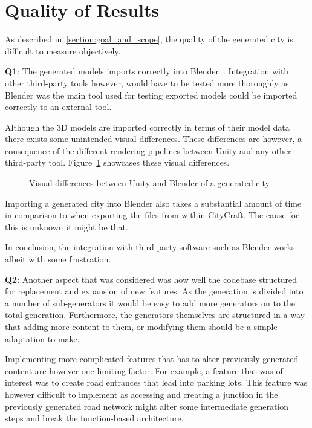 \section{Quality of Results}

As described in~\ref{section:goal_and_scope}, the quality of the generated city is difficult to measure objectively.

\textbf{Q1}:
The generated models imports correctly into Blender~\cite{blender}.
Integration with other third-party tools however, would have to be tested more thoroughly as Blender was the main tool used for testing exported models could be imported correctly to an external tool. 

Although the 3D models are imported correctly in terms of their model data there exists some unintended visual differences.
These differences are however, a consequence of the different rendering pipelines between Unity and any other third-party tool.
Figure~\ref{fig:blender_shading_result} showcases these visual differences.

\begin{figure}[h!]
  \centering
  \caption{Visual differences between Unity and Blender of a generated city.}
  \label{fig:blender_shading_result}
\end{figure}

Importing a generated city into Blender also takes a substantial amount of time in comparison to when exporting the files from within CityCraft.
The cause for this is unknown it might be that.

In conclusion, the integration with third-party software such as Blender works albeit with some frustration.

\textbf{Q2}:
Another aspect that was considered was how well the codebase structured for replacement and expansion of new features.
As the generation is divided into a number of sub-generators it would be easy to add more generators on to the total generation.
Furthermore, the generators themselves are structured in a way that adding more content to them, or modifying them should be a simple adaptation to make. 

Implementing more complicated features that has to alter previously generated content are however one limiting factor.
For example, a feature that was of interest was to create road entrances that lead into parking lots.
This feature was however difficult to implement as accessing and creating a junction in the previously generated road network might alter some intermediate generation steps and break the function-based architecture.

